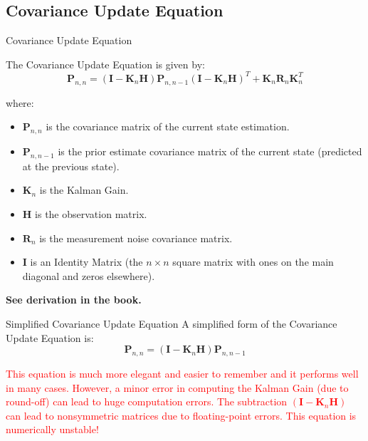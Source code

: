 \subsection{Covariance Update Equation}
\begin{frame}{Covariance Update Equation}
\begin{minipage}{1\linewidth} 
\begin{exampleblock}{}{
The Covariance Update Equation is given by:
\begin{equation*}
\mathbf{P}_{n,n} = (\mathbf{I} - \mathbf{K}_n\mathbf{H})\mathbf{P}_{n,n-1}(\mathbf{I} - \mathbf{K}_n\mathbf{H})^T + \mathbf{K}_n\mathbf{R}_n\mathbf{K}_n^T \tag{4}
\end{equation*}

where:
\begin{itemize}
    \item $\mathbf{P}_{n,n}$ is the covariance matrix of the current state estimation.
    \item $\mathbf{P}_{n,n-1}$ is the prior estimate covariance matrix of the current state (predicted at the previous state).
    \item $\mathbf{K}_n$ is the Kalman Gain.
    \item $\mathbf{H}$ is the observation matrix.
    \item $\mathbf{R}_n$ is the measurement noise covariance matrix.
    \item $\mathbf{I}$ is an Identity Matrix (the \(n \times n\) square matrix with ones on the main diagonal and zeros elsewhere).
\end{itemize}}
\end{exampleblock}
\end{minipage}

\textbf{See derivation in the book.}
\end{frame}
\begin{frame}{Simplified Covariance Update Equation}
A simplified form of the Covariance Update Equation is:
\begin{equation*}
\mathbf{P}_{n,n} = (\mathbf{I} - \mathbf{K}_n\mathbf{H})\mathbf{P}_{n,n-1}
\end{equation*}

\textcolor{red}{This equation is much more elegant and easier to remember and it performs well in many cases. However, a minor error in computing the Kalman Gain (due to round-off) can lead to huge computation errors. The subtraction $(\mathbf{I} - \mathbf{K}_n\mathbf{H})$ can lead to nonsymmetric matrices due to floating-point errors. This equation is numerically unstable!}
\end{frame}

